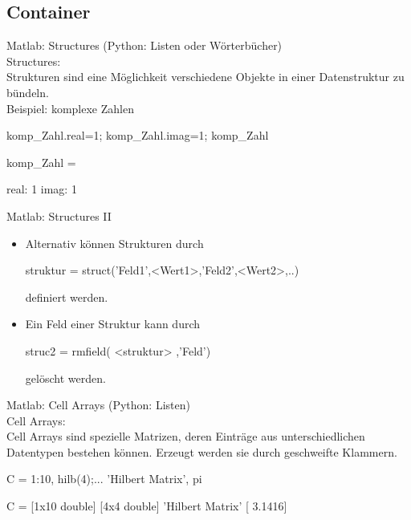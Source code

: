 \documentclass[hyperref={xetex}]{beamer}
\begin{document}
\subsection{Container}
%
%
\begin{frame}[fragile]{Matlab: Structures}
(Python: Listen oder Wörterbücher)\\
\alert{Structures:}\\
Strukturen sind eine Möglichkeit verschiedene Objekte in einer
Datenstruktur zu bündeln.\\[1cm]

\alert{Beispiel:} komplexe Zahlen
\begin{matlabin}
komp_Zahl.real=1;
komp_Zahl.imag=1;
komp_Zahl
\end{matlabin}
\begin{matlab}
komp_Zahl = 

    real: 1
    imag: 1
\end{matlab}
\end{frame}
%
%
\begin{frame}[fragile]{Matlab: Structures II}
\begin{itemize}
\item Alternativ können Strukturen durch
\begin{matlabin}
struktur = struct('Feld1',<Wert1>,'Feld2',<Wert2>,..)
\end{matlabin}
definiert werden.
\item Ein Feld einer Struktur  kann durch 
\begin{matlabin}
struc2 = rmfield( <struktur> ,'Feld')
\end{matlabin}
gel\"oscht werden. 
\end{itemize}
\end{frame}
%
%
\begin{frame}[fragile]{Matlab: Cell Arrays}
(Python: Listen)\\
\alert{Cell Arrays:} \\
Cell Arrays sind spezielle Matrizen, deren  Einträge aus unterschiedlichen
Datentypen bestehen können. Erzeugt
werden sie durch geschweifte Klammern.\\
\begin{matlabin}
C = { 1:10, hilb(4);...
       'Hilbert Matrix', pi}
\end{matlabin} 
\begin{matlab}
C = 
       [1x10 double]    [4x4 double]
    'Hilbert Matrix'    [    3.1416]
\end{matlab} 
\end{frame}
\end{document}
